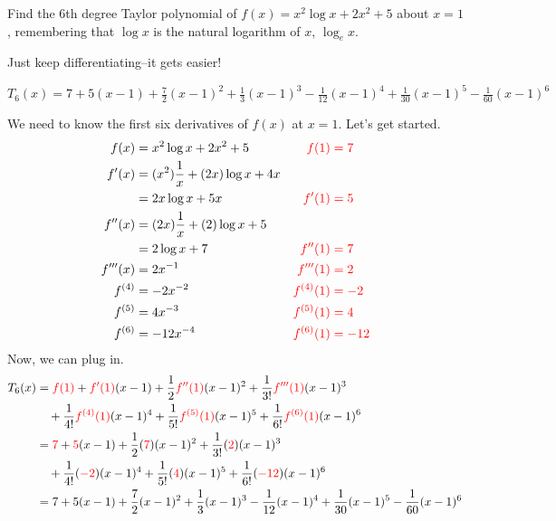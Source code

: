 \begin{Mquestion}
Find the 6th degree Taylor polynomial of $f(x)=x^2\log x+2x^2+5$ about $x=1$, remembering that $\log x$ is the natural logarithm of $x$, $\log_ex$.
\end{Mquestion}
\begin{hint}
Just keep differentiating--it gets easier!
\end{hint}
\begin{answer}
$T_6(x)=7+5(x-1)+\frac{7}{2}(x-1)^2+\frac{1}{3}(x-1)^3-\frac{1}{12}(x-1)^4+\frac{1}{30}(x-1)^5-\frac{1}{60}(x-1)^6
$
\end{answer}
\begin{solution}
We need to know the first six derivatives of $f(x)$ at $x=1$. Let's get started.
\begin{align*}
f(x)&=x^2\log x + 2x^2+5 & \color{red}f(1)&\color{red}=7\\
f'(x)&=(x^2)\frac{1}{x}+(2x)\log x + 4x \\
&=2x\log x + 5x& \color{red}f'(1)&\color{red}=5\\
f''(x)&=(2x)\frac{1}{x}+(2)\log x + 5\\
&=2\log x + 7& \color{red}f''(1)&\color{red}=7\\
f'''(x)&=2x^{-1}& \color{red}f'''(1)&\color{red}=2\\
f^{(4)}&=-2x^{-2}& \color{red}f^{(4)}(1)&\color{red}=-2\\
f^{(5)}&=4x^{-3}& \color{red}f^{(5)}(1)&\color{red}=4\\
f^{(6)}&=-12x^{-4}& \color{red}f^{(6)}(1)&\color{red}=-12
\end{align*}
Now, we can plug in.
\begin{align*}
T_6(x)&=\textcolor{red}{f(1)}+\textcolor{red}{f'(1)}(x-1)+\frac{1}{2}\textcolor{red}{f''(1)}(x-1)^2+\frac{1}{3!}\textcolor{red}{f'''(1)}(x-1)^3\\
&\quad
+\frac{1}{4!}\textcolor{red}{f^{(4)}(1)}(x-1)^4
+\frac{1}{5!}\textcolor{red}{f^{(5)}(1)}(x-1)^5
+\frac{1}{6!}\textcolor{red}{f^{(6)}(1)}(x-1)^6\\
&=\textcolor{red}{7}+\textcolor{red}{5}(x-1)+\frac{1}{2}(\textcolor{red}{7})(x-1)^2
+\frac{1}{3!}(\textcolor{red}{2})(x-1)^3\\
&\quad+\frac{1}{4!}(\textcolor{red}{-2})(x-1)^4
+\frac{1}{5!}(\textcolor{red}{4})(x-1)^5
+\frac{1}{6!}(\textcolor{red}{-12})(x-1)^6\\
&=7+5(x-1)+\frac{7}{2}(x-1)^2+\frac{1}{3}(x-1)^3-\frac{1}{12}(x-1)^4+\frac{1}{30}(x-1)^5-\frac{1}{60}(x-1)^6
\end{align*}
\end{solution}




